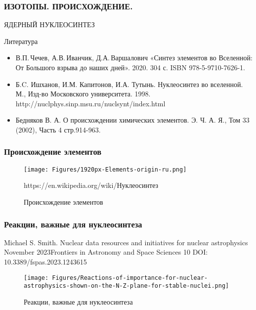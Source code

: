 \begin{frame}
\frametitle{ИЗОТОПЫ. ПРОИСХОЖДЕНИЕ.}

\begin{center}
{\large
ЯДЕРНЫЙ НУКЛЕОСИНТЕЗ}
\end{center}

Литература
\begin{itemize}
    \item  В.П.\,Чечев, А.В.\,Иванчик, Д.А.\,Варшалович «Синтез элементов во Вселенной: От Большого взрыва до наших дней». 2020. 304 с. ISBN 978-5-9710-7626-1.
    \item Б.C. Ишханов, И.М. Капитонов, И.А. Тутынь. Нуклеосинтез во вселенной.
		М., Изд-во Московского университета. 1998.\\
		http://nuclphys.sinp.msu.ru/nuclsynt/index.html
  \item Бедняков В. А. О происхождении химических элементов. Э. Ч. А. Я., Том 33 (2002), Часть 4 стр.914-963.
\end{itemize}
\end{frame}

\begin{frame}
\frametitle{Происхождение элементов}

	\begin{figure}[ht] 
	\centering\small
	\texttt{[image: Figures/1920px-Elements-origin-ru.png]}
	\caption{Происхождение элементов} https://en.wikipedia.org/wiki/Нуклеосинтез 
	\label{f:Nucleosynthesis_periodic_table}
\end{figure}
\end{frame}

\begin{frame}
\frametitle{Реакции, важные для нуклеосинтеза}

Michael S. Smith.	Nuclear data resources and initiatives for nuclear astrophysics 	November 2023Frontiers in Astronomy and Space Sciences 10 	DOI: 10.3389/fspas.2023.1243615
	\begin{figure}[ht] 
	\centering\small
	\texttt{[image: Figures/Reactions-of-importance-for-nuclear-astrophysics-shown-on-the-N-Z-plane-for-stable-nuclei.png]}
	\caption{Реакции, важные для нуклеосинтеза} 
	\label{f:Reactions-of-importance-for-nuclear-astrophysics}
\end{figure}

\end{frame}

